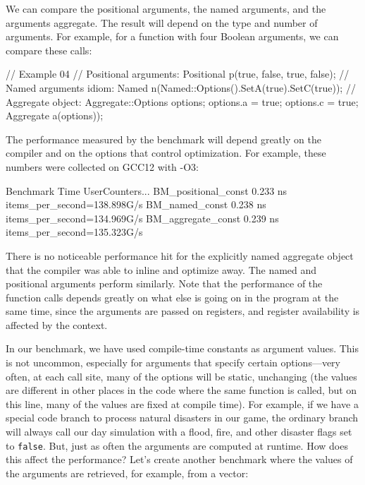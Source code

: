 
We can compare the positional arguments, the named arguments, and the arguments aggregate. The result will depend on the type and number of arguments. For example, for a function with four Boolean arguments, we can compare these calls:

\begin{code}
// Example 04
// Positional arguments:
Positional p(true, false, true, false);
// Named arguments idiom:
Named n(Named::Options().SetA(true).SetC(true));
// Aggregate object:
Aggregate::Options options;
options.a = true;
options.c = true;
Aggregate a(options));
\end{code}

The performance measured by the benchmark will depend greatly on the compiler and on the options that control optimization. For example, these numbers were collected on GCC12 with -O3:

\begin{code}
Benchmark                 Time  UserCounters...
BM_positional_const   0.233 ns  items_per_second=138.898G/s
BM_named_const        0.238 ns  items_per_second=134.969G/s
BM_aggregate_const    0.239 ns  items_per_second=135.323G/s
\end{code}

There is no noticeable performance hit for the explicitly named aggregate object that the compiler was able to inline and optimize away. The named and positional arguments perform similarly. Note that the performance of the function calls depends greatly on what else is going on in the program at the same time, since the arguments are passed on registers, and register availability is affected by the context.

In our benchmark, we have used compile-time constants as argument values. This is not uncommon, especially for arguments that specify certain options---very often, at each call site, many of the options will be static, unchanging (the values are different in other places in the code where the same function is called, but on this line, many of the values are fixed at compile time). For example, if we have a special code branch to process natural disasters in our game, the ordinary branch will always call our day simulation with a flood, fire, and other disaster flags set to \texttt{false}. But, just as often the arguments are computed at runtime. How does this affect the performance? Let's create another benchmark where the values of the arguments are retrieved, for example, from a vector:

